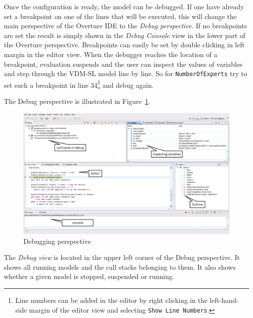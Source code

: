 {Once the configuration is ready, the model can be debugged. If one
have already set a breakpoint on one of the lines that will be
executed, this will
change the main perspective of the Overture IDE to the \emph{Debug
  perspective}. If no breakpoints are set the result is simply shown
in the \emph{Debug Console} view in the lower part of the Overture
perspective. Breakpoints can easily be set by double clicking in
left margin in the editor view. When the debugger reaches the location
of a breakpoint, evaluation suspends and the user can inspect the
values of variables and step through the VDM-SL model line by line. So
for \texttt{NumberOfExperts} try to set such a breakpoint in line
34\footnote{Line numbers can be added in the editor by right clicking
  in the left-hand-side 
 margin of the editor view and selecting \texttt{Show Line Numbers}.}
and debug again.
 
The Debug perspective is illustrated in Figure~\ref{fig:DebuggingVDM}.
\begin{figure}[htp]
\begin{center}
  \includegraphics[width=4.5in]{figures/DebuggingVDM}
  \caption[Debugging perspective]{Debugging perspective}
  \label{fig:DebuggingVDM}
\end{center}
\end{figure}
The \emph{Debug view} is located in the upper left corner of the Debug
perspective. It shows all running models and the call stacks belonging
to them. It also shows whether a given model is stopped, suspended or
running. 


}
